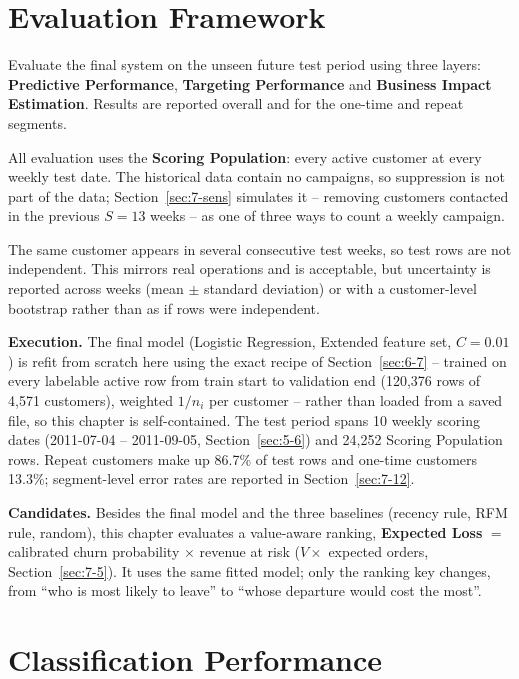 \section{Evaluation Framework}
\label{sec:7-1}

Evaluate the final system on the unseen future test period using three layers: \textbf{Predictive Performance}, \textbf{Targeting Performance} and \textbf{Business Impact Estimation}. Results are reported overall and for the one-time and repeat segments.

All evaluation uses the \textbf{Scoring Population}: every active customer at every weekly test date. The historical data contain no campaigns, so suppression is not part of the data; Section~\ref{sec:7-sens} simulates it -- removing customers contacted in the previous $S = 13$ weeks -- as one of three ways to count a weekly campaign.

The same customer appears in several consecutive test weeks, so test rows are not independent. This mirrors real operations and is acceptable, but uncertainty is reported across weeks (mean $\pm$ standard deviation) or with a customer-level bootstrap rather than as if rows were independent.

\textbf{Execution.} The final model (Logistic Regression, Extended feature set, $C=0.01$) is refit from scratch here using the exact recipe of Section~\ref{sec:6-7} -- trained on every labelable active row from train start to validation end (120,376 rows of 4,571 customers), weighted $1/n_i$ per customer -- rather than loaded from a saved file, so this chapter is self-contained. The test period spans 10 weekly scoring dates (2011-07-04 -- 2011-09-05, Section~\ref{sec:5-6}) and 24,252 Scoring Population rows. Repeat customers make up 86.7\% of test rows and one-time customers 13.3\%; segment-level error rates are reported in Section~\ref{sec:7-12}.

\textbf{Candidates.} Besides the final model and the three baselines (recency rule, RFM rule, random), this chapter evaluates a value-aware ranking, \textbf{Expected Loss} $=$ calibrated churn probability $\times$ revenue at risk ($V \times$ expected orders, Section~\ref{sec:7-5}). It uses the same fitted model; only the ranking key changes, from ``who is most likely to leave'' to ``whose departure would cost the most''.

\section{Classification Performance}
\label{sec:7-2}

